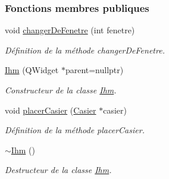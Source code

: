 \subsubsection*{Fonctions membres publiques}
\begin{DoxyCompactItemize}
\item 
void \hyperlink{class_ihm_ab33d5d0a85d60a8d41bae11c34435d50}{changer\+De\+Fenetre} (int fenetre)
\begin{DoxyCompactList}\small\item\em Définition de la méthode changer\+De\+Fenetre. \end{DoxyCompactList}\item 
\hyperlink{class_ihm_a50a7a15775452923868348bdbe4fa51e}{Ihm} (Q\+Widget $\ast$parent=nullptr)
\begin{DoxyCompactList}\small\item\em Constructeur de la classe \hyperlink{class_ihm}{Ihm}. \end{DoxyCompactList}\item 
void \hyperlink{class_ihm_a4ba75b0606c75d616dab3afd67660fd4}{placer\+Casier} (\hyperlink{class_casier}{Casier} $\ast$casier)
\begin{DoxyCompactList}\small\item\em Définition de la méthode placer\+Casier. \end{DoxyCompactList}\item 
\hyperlink{class_ihm_add292ea9005bacd1de44dd1ed9ede5b9}{$\sim$\+Ihm} ()
\begin{DoxyCompactList}\small\item\em Destructeur de la classe \hyperlink{class_ihm}{Ihm}. \end{DoxyCompactList}\end{DoxyCompactItemize}
